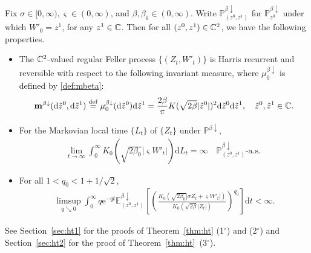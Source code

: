 \documentclass[12pt, twoside]{article}
\numberwithin{figure}{section}
\newcommand{\e}{{\mathrm e}}
\newcommand{\1}{\mathds 1}
\newcommand{\da}{{\downarrow}}
\renewcommand{\P}{{\mathbb P}}
\newcommand{\E}{{\mathbb E}}
\renewcommand{\d}{{\mathrm d}}
\newcommand{\2}{{\mathbf 1}}
\newcommand{\defeq}{{\stackrel{\rm def}{=}}}
\newcommand{\cc}{{^\circ}}
\newcommand{\two}{{\sqrt{2}}}
\begin{document}
\begin{thm}\label{thm:ht}
Fix $\sigma\in [0,\infty),\varsigma\in (0,\infty)$, and $\beta,\beta_0\in (0,\infty)$. Write $\P^{\beta\da}_{(z^0,z^1)}$ for $\P^{\beta\da}_{z^0}$ under which $W'_0=z^1$, for any $z^1\in \Bbb C$. Then for all $(z^0,z^1)\in \Bbb C^2$, we have the following properties.
\begin{itemize}
\item [\rm (1$\cc$)] The $\Bbb C^2$-valued regular Feller process $\{(Z_t,W'_t)\}$ is Harris recurrent and reversible with respect to the following invariant measure, where $\mu_0^{\beta\da}$ is defined by \eqref{def:mbeta}:
\begin{align}\label{def:tmbeta}
\mathbf m^{\beta\da}(\d \tilde{z}^0,\d \tilde{z}^1)\;\defeq\; \mu_0^{\beta\da}(\d \tilde{z}^0)\d \tilde{z}^1=\frac{2\beta}{\pi}K(\sqrt{2\beta}|\tilde{z}^0|)^2\d \tilde{z}^0\d \tilde{z}^1,\quad \tilde{z}^0,\tilde{z}^1\in \Bbb C.
\end{align}

\item [\rm (2$\cc$)] 
For the Markovian local time $\{L_t\}$ of $\{Z_t\}$ under $\P^{\beta\da}$,
\begin{align}\label{ineq:LTinfty}
\lim_{t\to\infty}\int_0^\infty K_0(\sqrt{2\beta_0}|\varsigma W'_t|)\d L_t=\infty \quad \P^{\beta\da}_{(z^0,z^1)}\mbox{-a.s. }
\end{align}


\item [\rm (3$\cc$)] For all $1<q_0<1+1/\two$,
\begin{gather}
\limsup_{q\searrow 0}\int_0^\infty  q\e^{-qt}\E^{\beta\da}_{(z^0,z^1)}\left[\left(\frac{K_0(\sqrt{2\beta_0}|\sigma Z_t+\varsigma W'_t|)}{K_0(\sqrt{2\beta}|Z_t|)}\right)^{q_0}\right]\d t<\infty.\label{ht:1}
\end{gather}
\end{itemize}
\end{thm}

See Section~\ref{sec:ht1} for the proofs of Theorem~\ref{thm:ht} (1$\cc$) and (2$\cc$) and Section~\ref{sec:ht2} for the proof of Theorem~\ref{thm:ht}~(3$\cc$). 
\end{document}
